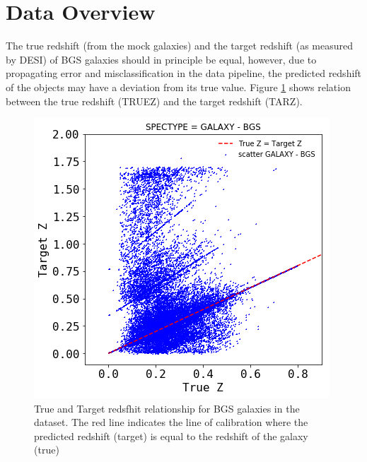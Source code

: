 \documentclass[]{article}
\begin{document}
\section{Data Overview}

The true redshift (from the mock galaxies) and the target redshift (as measured by DESI) of BGS galaxies should in principle be equal, however, due to propagating error and misclassification in the data pipeline, the predicted redshift of the objects may have a deviation from its true value. Figure \ref{fig:bgs-z-truez} shows relation between the true redshift (TRUEZ) and the target redshift (TARZ). 
\begin{figure}[h!]
	\centering
	\includegraphics[width=0.6\linewidth]{TeX_files/Imagenes/BGS-z-truez}
	\caption{True and Target redsfhit relationship for BGS galaxies in the dataset. The red line indicates the line of calibration where the predicted redshift (target) is equal to the redshift of the galaxy (true) }
	\label{fig:bgs-z-truez}
\end{figure}
\end{document}

